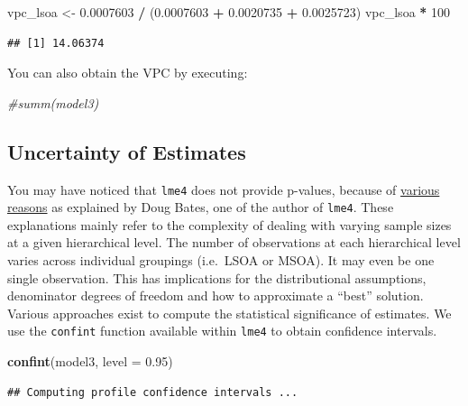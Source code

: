 \documentclass[]{book}
\newenvironment{Shaded}{\begin{snugshade}}{\end{snugshade}}
\newcommand{\KeywordTok}[1]{\textcolor[rgb]{0.13,0.29,0.53}{\textbf{#1}}}
\newcommand{\DataTypeTok}[1]{\textcolor[rgb]{0.13,0.29,0.53}{#1}}
\newcommand{\DecValTok}[1]{\textcolor[rgb]{0.00,0.00,0.81}{#1}}
\newcommand{\FloatTok}[1]{\textcolor[rgb]{0.00,0.00,0.81}{#1}}
\newcommand{\StringTok}[1]{\textcolor[rgb]{0.31,0.60,0.02}{#1}}
\newcommand{\CommentTok}[1]{\textcolor[rgb]{0.56,0.35,0.01}{\textit{#1}}}
\newcommand{\OperatorTok}[1]{\textcolor[rgb]{0.81,0.36,0.00}{\textbf{#1}}}
\newcommand{\NormalTok}[1]{#1}
\begin{document}
\begin{Shaded}
\begin{Highlighting}[]
\NormalTok{vpc_lsoa <-}\StringTok{ }\FloatTok{0.0007603} \OperatorTok{/}\StringTok{ }\NormalTok{(}\FloatTok{0.0007603} \OperatorTok{+}\StringTok{ }\FloatTok{0.0020735} \OperatorTok{+}\StringTok{ }\FloatTok{0.0025723}\NormalTok{)}
\NormalTok{vpc_lsoa }\OperatorTok{*}\StringTok{ }\DecValTok{100}
\end{Highlighting}
\end{Shaded}

\begin{verbatim}
## [1] 14.06374
\end{verbatim}

You can also obtain the VPC by executing:

\begin{Shaded}
\begin{Highlighting}[]
\CommentTok{#summ(model3)}
\end{Highlighting}
\end{Shaded}

\subsection{Uncertainty of Estimates}\label{uncertainty-of-estimates}

You may have noticed that \texttt{lme4} does not provide p-values,
because of
\href{https://stat.ethz.ch/pipermail/r-help/2006-May/094765.html}{various
reasons} as explained by Doug Bates, one of the author of \texttt{lme4}.
These explanations mainly refer to the complexity of dealing with
varying sample sizes at a given hierarchical level. The number of
observations at each hierarchical level varies across individual
groupings (i.e.~LSOA or MSOA). It may even be one single observation.
This has implications for the distributional assumptions, denominator
degrees of freedom and how to approximate a ``best'' solution. Various
approaches exist to compute the statistical significance of estimates.
We use the \texttt{confint} function available within \texttt{lme4} to
obtain confidence intervals.

\begin{Shaded}
\begin{Highlighting}[]
\KeywordTok{confint}\NormalTok{(model3, }\DataTypeTok{level =} \FloatTok{0.95}\NormalTok{)}
\end{Highlighting}
\end{Shaded}

\begin{verbatim}
## Computing profile confidence intervals ...
\end{verbatim}
\end{document}
